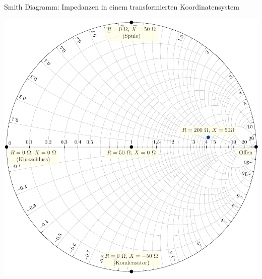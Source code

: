 \documentclass[aspectratio=169,handout]{beamer}
\begin{document}
\begin{frame}{Smith Diagramm: Impedanzen in einem transformierten Koordinatensystem}
    \begin{center}\includegraphics[height=0.9\textheight]{../skript/figures/complex_smith/complex_smith.pdf}\end{center}
\end{frame}
\end{document}
